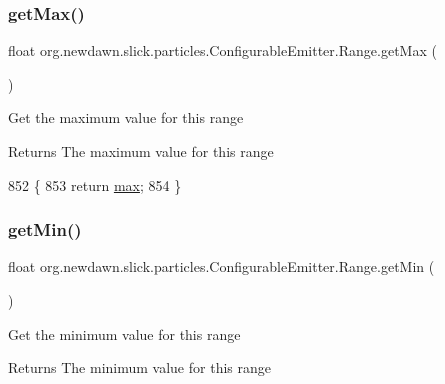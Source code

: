 \subsubsection{\texorpdfstring{get\+Max()}{getMax()}}
{\footnotesize\ttfamily float org.\+newdawn.\+slick.\+particles.\+Configurable\+Emitter.\+Range.\+get\+Max (\begin{DoxyParamCaption}{ }\end{DoxyParamCaption})\hspace{0.3cm}{\ttfamily [inline]}}

Get the maximum value for this range

\begin{DoxyReturn}{Returns}
The maximum value for this range 
\end{DoxyReturn}

\begin{DoxyCode}
852                               \{
853             \textcolor{keywordflow}{return} \mbox{\hyperlink{classorg_1_1newdawn_1_1slick_1_1particles_1_1_configurable_emitter_1_1_range_a6950c49934d7424d5ab449b3b3256ec0}{max}};
854         \}
\end{DoxyCode}
\mbox{\label{classorg_1_1newdawn_1_1slick_1_1particles_1_1_configurable_emitter_1_1_range_a5f213f872614c3cef6b8ae29a030def4}} 
\subsubsection{\texorpdfstring{get\+Min()}{getMin()}}
{\footnotesize\ttfamily float org.\+newdawn.\+slick.\+particles.\+Configurable\+Emitter.\+Range.\+get\+Min (\begin{DoxyParamCaption}{ }\end{DoxyParamCaption})\hspace{0.3cm}{\ttfamily [inline]}}

Get the minimum value for this range

\begin{DoxyReturn}{Returns}
The minimum value for this range 
\end{DoxyReturn}

